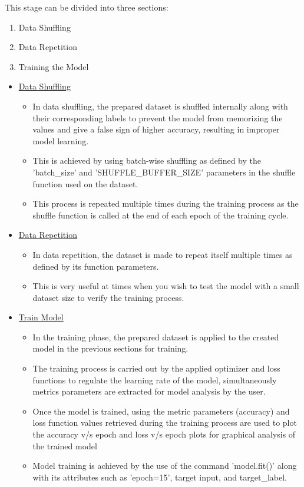\noindent This stage can be divided into three sections:
\begin{enumerate}
  \item Data Shuffling
  \item Data Repetition
  \item Training the Model
\end{enumerate}


\begin{itemize}
  \item \underline{Data Shuffling}

    \begin{itemize}
      \item In data shuffling, the prepared dataset is shuffled internally along with their corresponding labels to prevent the model from memorizing the values and give a false sign of higher accuracy, resulting in improper model learning.
      \item This is achieved by using batch-wise shuffling as defined by the 'batch\_size' and 'SHUFFLE\_BUFFER\_SIZE' parameters in the shuffle function used on the dataset.
      \item This process is repeated multiple times during the training process as the shuffle function is called at the end of each epoch of the training cycle.
    \end{itemize}

  \item \underline{Data Repetition}
    \begin{itemize}
      \item In data repetition, the dataset is made to repeat itself multiple times as defined by its function parameters.
      \item This is very useful at times when you wish to test the model with a small dataset size to verify the training process.
    \end{itemize}

  \item \underline{Train Model}
    \begin{itemize}
      \item In the training phase, the prepared dataset is applied to the created model in the previous sections for training.
      \item The training process is carried out by the applied optimizer and loss functions to regulate the learning rate of the model, simultaneously metrics parameters are extracted for model analysis by the user.
      \item Once the model is trained, using the metric parameters (accuracy) and loss function values retrieved during the training process are used to plot the accuracy v/s epoch and loss v/s epoch plots for graphical analysis of the trained model
      \item Model training is achieved by the use of the command 'model.fit()' along with its attributes such as 'epoch=15', target input, and target\_label.
    \end{itemize}

\end{itemize}



